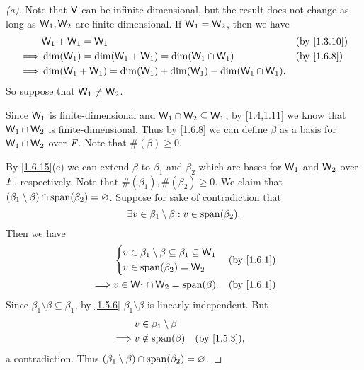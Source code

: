 \begin{proof}[(a)]
  Note that \(\mathsf{V}\) can be infinite-dimensional, but the result does not change as long as \(\mathsf{W}_1, \mathsf{W}_2\) are finite-dimensional.
  If \(\mathsf{W}_1 = \mathsf{W}_2\), then we have
  \begin{align*}
             & \W_1 + \W_1 = \W_1                                                  &  & \text{(by \cref{1.3.10})} \\
    \implies & \dim(\W_1) = \dim(\W_1 + \W_1) = \dim(\W_1 \cap \W_1)               &  & \text{(by \cref{1.6.8})}  \\
    \implies & \dim(\W_1 + \W_1) = \dim(\W_1) + \dim(\W_1) - \dim(\W_1 \cap \W_1).
  \end{align*}
  So suppose that \(\mathsf{W}_1 \neq \mathsf{W}_2\).

  Since \(\mathsf{W}_1\) is finite-dimensional and \(\mathsf{W}_1 \cap \mathsf{W}_2 \subseteq \mathsf{W}_1\), by \cref{1.4,1.11} we know that \(\mathsf{W}_1 \cap \mathsf{W}_2\) is finite-dimensional.
  Thus by \cref{1.6.8} we can define \(\beta\) as a basis for \(\mathsf{W}_1 \cap \mathsf{W}_2\) over \(\mathit{F}\).
  Note that \(\#(\beta) \geq 0\).

  By \cref{1.6.15}(c) we can extend \(\beta\) to \(\beta_1\) and \(\beta_2\) which are bases for \(\mathsf{W}_1\) and \(\mathsf{W}_2\) over \(\mathit{F}\), respectively.
  Note that \(\#(\beta_1), \#(\beta_2) \geq 0\).
  We claim that \((\beta_1 \setminus \beta) \cap \spn{\beta_2} = \varnothing\).
  Suppose for sake of contradiction that
  \[
    \exists v \in \beta_1 \setminus \beta : v \in \spn{\beta_2}.
  \]
  Then we have
  \begin{align*}
             & \begin{dcases}
                 v \in \beta_1 \setminus \beta \subseteq \beta_1 \subseteq \W_1 \\
                 v \in \spn{\beta_2} = \W_2
               \end{dcases} &  & \text{(by \cref{1.6.1})}                                  \\
    \implies & v \in \W_1 \cap \W_2 = \spn{\beta}.                               &  & \text{(by \cref{1.6.1})}
  \end{align*}
  Since \(\beta_1 \setminus \beta \subseteq \beta_1\), by \cref{1.5.6} \(\beta_1 \setminus \beta\) is linearly independent.
  But
  \begin{align*}
             & v \in \beta_1 \setminus \beta                                \\
    \implies & v \notin \spn{\beta}          &  & \text{(by \cref{1.5.3})},
  \end{align*}
  a contradiction.
  Thus \((\beta_1 \setminus \beta) \cap \spn{\beta_2} = \varnothing\).


\end{proof}
